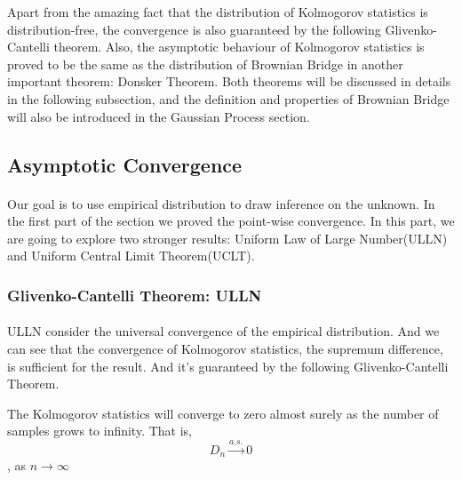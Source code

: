 \documentclass[final_project_1.tex]{subfiles}
\begin{document}
Apart from the amazing fact that the distribution of Kolmogorov statistics is distribution-free, the convergence is also guaranteed by the following Glivenko-Cantelli theorem. Also, the asymptotic behaviour of Kolmogorov statistics is proved to be the same as the distribution of Brownian Bridge in another important theorem: Donsker Theorem. Both theorems will be discussed in details in the following subsection, and the definition and properties of Brownian Bridge will also be introduced in the Gaussian Process section.


\subsection{Asymptotic Convergence}
\paragraph{}
Our goal is to use empirical distribution to draw inference on the unknown. In the first part of the section we proved the point-wise convergence. In this part, we are going to explore two stronger results: Uniform Law of Large Number(ULLN) and Uniform Central Limit Theorem(UCLT).
\subsubsection{Glivenko-Cantelli Theorem: ULLN}
\paragraph{}
ULLN consider the universal convergence of the empirical distribution. And we can see that the convergence of Kolmogorov statistics, the supremum difference, is sufficient for the result. And it's guaranteed by the following Glivenko-Cantelli Theorem.
\begin{theorem}
The Kolmogorov statistics will converge to zero almost surely as the number of samples grows to infinity. That is,
$$D_n\xrightarrow{a.s.}0$$, as $n\rightarrow\infty$
\end{theorem}
\end{document}
